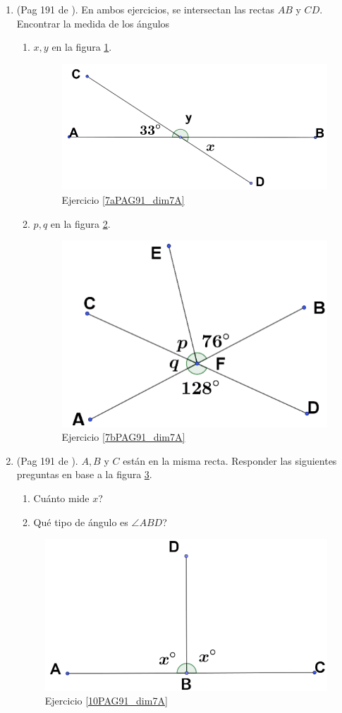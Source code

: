 \begin{enumerate}
	\item (Pag 191 de \cite{Dimensions_Math_7A}). En ambos ejercicios, se intersectan las rectas $AB$ y $CD$. Encontrar la medida de los ángulos 
	\begin{enumerate}[label=\Alph*) ]
		\item \label{7aPAG91_dim7A} $x,y$ en la figura \ref{dimensions_7A_p191_7a}.
		\begin{figure}[H]
			\centering
			\includegraphics[width=0.35\linewidth]{Geometria/imgs/dimensions_7A_p191_7a}
			\caption{Ejercicio \ref{7aPAG91_dim7A}}
			\label{dimensions_7A_p191_7a}
		\end{figure}
		\item \label{7bPAG91_dim7A} $p,q$ en la figura \ref{dimensions_7A_p191_7b}.
		\begin{figure}[H]
			\centering
			\includegraphics[width=0.35\linewidth]{Geometria/imgs/dimensions_7A_p191_7b}
			\caption{Ejercicio \ref{7bPAG91_dim7A}}
			\label{dimensions_7A_p191_7b}
		\end{figure}
	\end{enumerate}	
	
	\item \label{10PAG91_dim7A}(Pag 191 de \cite{Dimensions_Math_7A}). $A,B$ y $C$ están en la misma recta. Responder las siguientes preguntas en base a la figura \ref{dimensions_7A_p191_10}.
	\begin{enumerate}[label=\Alph*) ]
		\item Cuánto mide $x$?
		\item Qué tipo de ángulo es $\angle ABD$?
	\end{enumerate}	
	\begin{figure}[H]
		\centering
		\includegraphics[width=0.35\linewidth]{Geometria/imgs/dimensions_7A_p191_10}
		\caption{Ejercicio \ref{10PAG91_dim7A}}
		\label{dimensions_7A_p191_10}
	\end{figure}
	

\end{enumerate}
